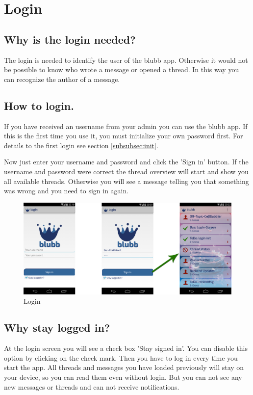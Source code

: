 \documentclass[12pt,a4paper,oneside]{report}
\newcommand{\appname}{blubb}
\begin{document}
\section{Login}
\subsection{Why is the login needed?}
The login is needed to identify the user of the \appname{} app. Otherwise it would not be possible to know who wrote a message or opened a thread. In this way you can recognize the author of a message.

\subsection{How to login.}
If you have received an username from your admin you can use the \appname{} app. If this is the first time you use it, you must initialize your own password first. For details to the first login see section \ref{subsubsec:init}.

Now just enter your username and password and click the 'Sign in' button. If the username and password were correct the thread overview will start and show you all available threads. Otherwise you will see a message telling you that something was wrong and you need to sign in again.

\begin{figure}[!ht]
    \includegraphics[width=\linewidth]{Login.png}
    \caption{Login}
\end{figure}

\subsection{Why stay logged in?}
At the login screen you will see a check box 'Stay signed in'. You can disable this option by clicking on the check mark. Then you have to log in every time you start the app. All threads and messages you have loaded previously will stay on your device, so you can read them even without login. But you can not see any new messages or threads and can not receive notifications. 
\end{document}
